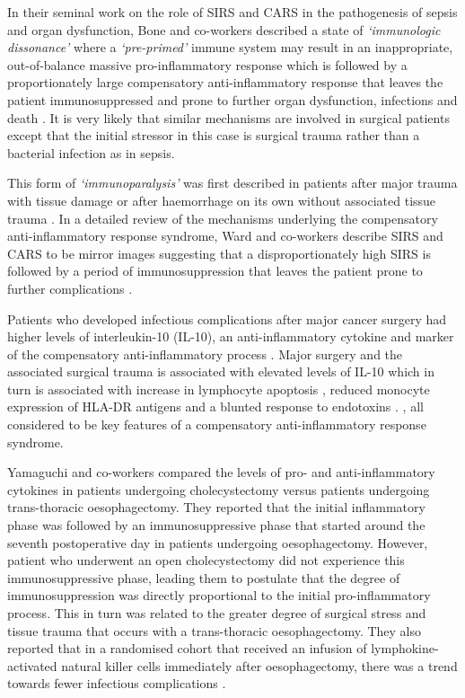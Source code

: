 In their seminal work on the role of SIRS and CARS in the pathogenesis of sepsis and organ dysfunction, Bone and co-workers described a state of \textit{`immunologic dissonance'} where a \textit{`pre-primed'} immune system may result in an inappropriate, out-of-balance massive pro-inflammatory response which is followed by a proportionately large compensatory anti-inflammatory response that leaves the patient immunosuppressed and prone to further organ dysfunction, infections and death \parencite{bone_sepsis:_1997, bone_immunologic_1996}. 
It is very likely that similar mechanisms are involved in surgical patients except that the initial stressor in this case is surgical trauma rather than a bacterial infection as in sepsis. 

This form of \textit{`immunoparalysis'} was first described in patients after major trauma with tissue damage \parencite{abraham_effects_1985,bandyopadhyay_negative_2007} or after haemorrhage on its own without associated tissue trauma \parencite{stephan_hemorrhage_1987}. 
In a detailed review of the mechanisms underlying the compensatory anti-inflammatory response syndrome, Ward and co-workers describe SIRS and CARS to be mirror images suggesting that a disproportionately high SIRS is followed by a period of immunosuppression that leaves the patient prone to further complications \parencite{ward_compensatory_2008}. 

Patients who developed infectious complications after major cancer surgery had higher levels of interleukin-10 (IL-10), an anti-inflammatory cytokine and marker of the compensatory anti-inflammatory process \parencite{mokart_early_2002}. 
Major surgery and the associated surgical trauma is associated with elevated levels of IL-10 which in turn is associated with increase in lymphocyte apoptosis \parencite{delogu_interleukin-10_2001}, reduced monocyte expression of HLA-DR antigens \parencite{klava_interleukin-10._1997} and a blunted response to endotoxins \parencite{ogata_role_2000, kawasaki_surgical_2001}. , all considered to be key features of a compensatory anti-inflammatory response syndrome. 

Yamaguchi and co-workers compared the levels of pro- and anti-inflammatory cytokines in patients undergoing cholecystectomy versus patients undergoing trans-thoracic oesophagectomy. 
They reported that the initial inflammatory phase was followed by an immunosuppressive phase that started around the seventh postoperative day in patients undergoing oesophagectomy. 
However, patient who underwent an open cholecystectomy did not experience this immunosuppressive phase, leading them to postulate that the degree of immunosuppression was directly proportional to the initial pro-inflammatory process. 
This in turn was related to the greater degree of surgical stress and tissue trauma that occurs with a trans-thoracic oesophagectomy. 
They also reported that in a randomised cohort that received an infusion of lymphokine-activated natural killer cells immediately after oesophagectomy, there was a trend towards fewer infectious complications \parencite{yamaguchi_postoperative_2006}. 

